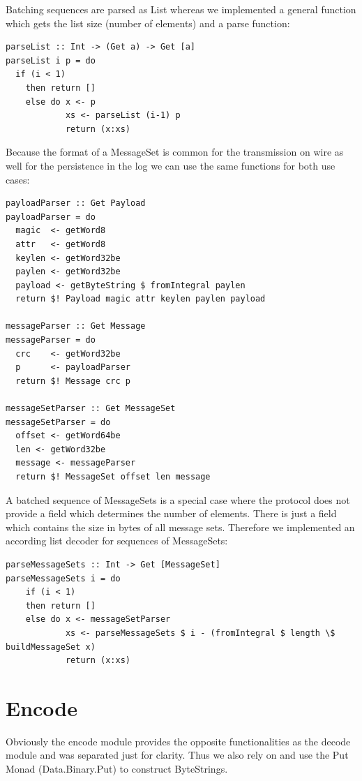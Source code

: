 Batching sequences are parsed as List whereas we implemented a general function
which gets the list size (number of elements) and a parse function: 
\begin{lstlisting}
parseList :: Int -> (Get a) -> Get [a]
parseList i p = do 
  if (i < 1) 
    then return []
    else do x <- p
            xs <- parseList (i-1) p
            return (x:xs)
\end{lstlisting}

Because the format of a MessageSet is common for the transmission on wire as
well for the persistence in the log we can use the same functions for both use cases:
\begin{lstlisting}
payloadParser :: Get Payload
payloadParser = do
  magic  <- getWord8
  attr   <- getWord8
  keylen <- getWord32be
  paylen <- getWord32be
  payload <- getByteString $ fromIntegral paylen
  return $! Payload magic attr keylen paylen payload

messageParser :: Get Message 
messageParser = do 
  crc    <- getWord32be
  p      <- payloadParser
  return $! Message crc p

messageSetParser :: Get MessageSet 
messageSetParser = do 
  offset <- getWord64be
  len <- getWord32be 
  message <- messageParser
  return $! MessageSet offset len message
\end{lstlisting}

A batched sequence of MessageSets is a special case where the protocol does not provide a
field which determines the number of elements. There is just a field which contains
the size in bytes of all message sets. Therefore we implemented an according
list decoder for sequences of MessageSets:
\begin{lstlisting}
parseMessageSets :: Int -> Get [MessageSet]
parseMessageSets i = do
    if (i < 1)
    then return []
    else do x <- messageSetParser
            xs <- parseMessageSets $ i - (fromIntegral $ length \$ buildMessageSet x)
            return (x:xs)
\end{lstlisting}

\section{Encode}
Obviously the encode module provides the opposite functionalities as the decode
module and was separated just for clarity. Thus we also rely on
and use the Put Monad (Data.Binary.Put) to construct ByteStrings.

